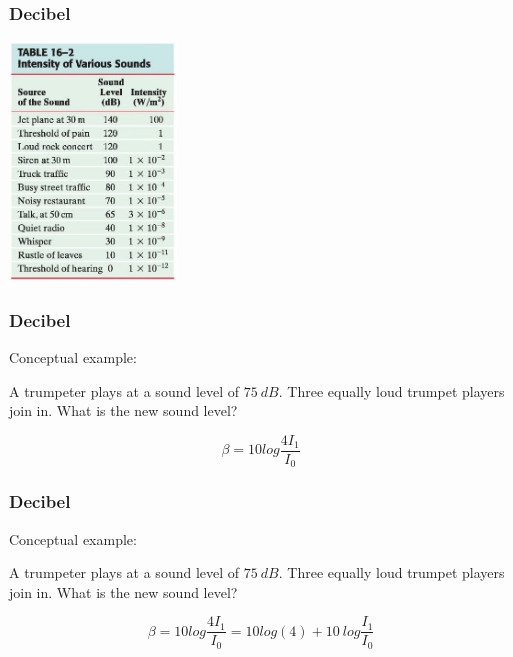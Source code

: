 \documentclass[]{beamer}
\begin{document}
\begin{frame}
\frametitle{Decibel}

  \begin{center}
  \includegraphics[height=2.5in]{images4/decibels.jpg}
\end{center}




  \end{frame}






\begin{frame}
\frametitle{Decibel}
Conceptual example:

\vspace{3mm}

A trumpeter plays at a sound level of $75~dB$. Three equally loud trumpet players join in. What is the new
sound level?

\pause

\begin{equation*}
\beta =10 log\frac{4 I_1}{I_0}
\end{equation*}


  \end{frame}





\begin{frame}
\frametitle{Decibel}
Conceptual example:

\vspace{3mm}

A trumpeter plays at a sound level of $75~dB$. Three equally loud trumpet players join in. What is the new
sound level?

\begin{equation*}
\beta =10 log\frac{4 I_1}{I_0}=10log(4)+10~log\frac{ I_1}{I_0}
\end{equation*}


  \end{frame}
\end{document}
